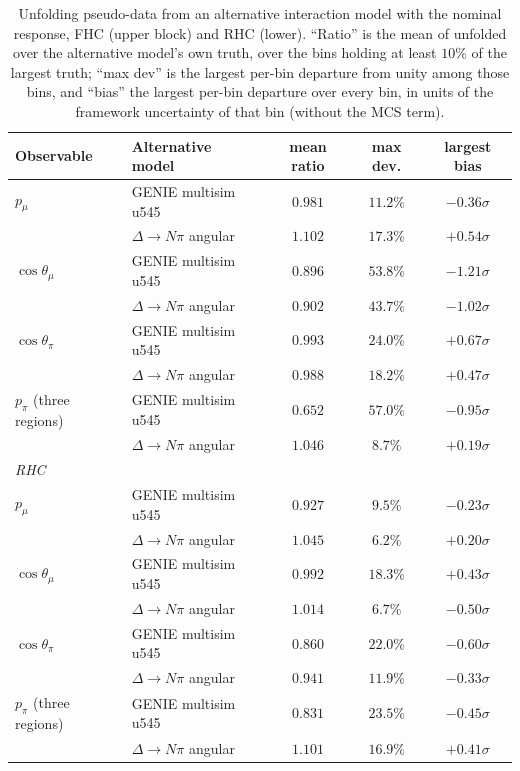 \documentclass[11pt,a4paper]{article}
\begin{document}
\begin{table}[H]
  \centering
  \caption{Unfolding pseudo-data from an alternative interaction model with the nominal response, FHC (upper block) and RHC (lower).
    ``Ratio'' is the mean of unfolded over the alternative model's own truth, over the bins holding at
    least $10\%$ of the largest truth; ``max dev'' is the largest per-bin departure from unity among
    those bins, and ``bias'' the largest per-bin departure over every bin, in units of the framework
    uncertainty of that bin (without the MCS term).}
  \label{tab:altmodel}
  \small
  \begin{tabular}{llccc}
    \toprule
    Observable & Alternative model & mean ratio & max dev. & largest bias \\
    \midrule
    $p_\mu$ & GENIE multisim u545 & $0.981$ & $11.2\%$ & $-0.36\sigma$ \\
            & $\Delta\to N\pi$ angular & $1.102$ & $17.3\%$ & $+0.54\sigma$ \\
    $\cos\theta_\mu$ & GENIE multisim u545 & $0.896$ & $53.8\%$ & $-1.21\sigma$ \\
                     & $\Delta\to N\pi$ angular & $0.902$ & $43.7\%$ & $-1.02\sigma$ \\
    $\cos\theta_\pi$ & GENIE multisim u545 & $0.993$ & $24.0\%$ & $+0.67\sigma$ \\
                     & $\Delta\to N\pi$ angular & $0.988$ & $18.2\%$ & $+0.47\sigma$ \\
    $p_\pi$ (three regions) & GENIE multisim u545 & $0.652$ & $57.0\%$ & $-0.95\sigma$ \\
                            & $\Delta\to N\pi$ angular & $1.046$ & $8.7\%$ & $+0.19\sigma$ \\
    \midrule
    \multicolumn{5}{l}{\emph{RHC}} \\
    $p_\mu$ & GENIE multisim u545 & $0.927$ & $9.5\%$ & $-0.23\sigma$ \\
            & $\Delta\to N\pi$ angular & $1.045$ & $6.2\%$ & $+0.20\sigma$ \\
    $\cos\theta_\mu$ & GENIE multisim u545 & $0.992$ & $18.3\%$ & $+0.43\sigma$ \\
                     & $\Delta\to N\pi$ angular & $1.014$ & $6.7\%$ & $-0.50\sigma$ \\
    $\cos\theta_\pi$ & GENIE multisim u545 & $0.860$ & $22.0\%$ & $-0.60\sigma$ \\
                     & $\Delta\to N\pi$ angular & $0.941$ & $11.9\%$ & $-0.33\sigma$ \\
    $p_\pi$ (three regions) & GENIE multisim u545 & $0.831$ & $23.5\%$ & $-0.45\sigma$ \\
                            & $\Delta\to N\pi$ angular & $1.101$ & $16.9\%$ & $+0.41\sigma$ \\
    \bottomrule
  \end{tabular}
\end{table}
\end{document}

